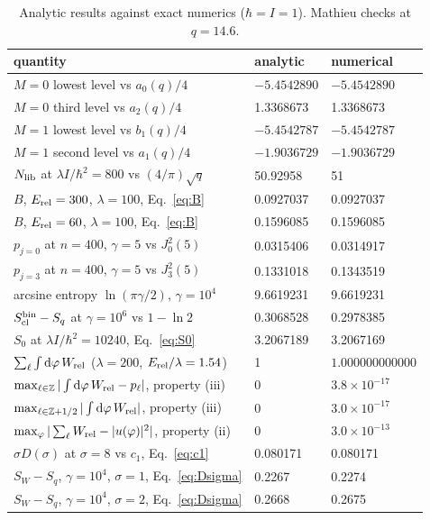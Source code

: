 \documentclass[preprint,12pt]{elsarticle}
\newcommand{\dd}{\mathrm{d}}
\newcommand{\Erel}{E_{\rm rel}}
\newcommand{\Scl}{S_{\rm cl}}
\newcommand{\SW}{S_{W}}
\begin{document}
\begin{table}[h]
\centering
\caption{Analytic results against exact numerics ($\hbar=I=1$). Mathieu checks
at $q=14.6$.}
\label{tab:checks}
\small
\renewcommand{\arraystretch}{1.12}
\begin{tabular}{lll}
\toprule
quantity & analytic & numerical\\
\midrule
$M=0$ lowest level vs $a_{0}(q)/4$ & $-5.4542890$ & $-5.4542890$ \\
$M=0$ third level vs $a_{2}(q)/4$ & 1.3368673 & 1.3368673 \\
$M=1$ lowest level vs $b_{1}(q)/4$ & $-5.4542787$ & $-5.4542787$ \\
$M=1$ second level vs $a_{1}(q)/4$ & $-1.9036729$ & $-1.9036729$ \\
$N_{\rm lib}$ at $\lambda I/\hbar^{2}=800$ vs $(4/\pi)\sqrt q$ & 50.92958 & 51 \\
$B$, $\Erel=300$, $\lambda=100$, Eq.~\eqref{eq:B} & 0.0927037 & 0.0927037 \\
$B$, $\Erel=60$, $\lambda=100$, Eq.~\eqref{eq:B} & 0.1596085 & 0.1596085 \\
$p_{j=0}$ at $n=400$, $\gamma=5$ vs $J_{0}^{2}(5)$ & 0.0315406 & 0.0314917 \\
$p_{j=3}$ at $n=400$, $\gamma=5$ vs $J_{3}^{2}(5)$ & 0.1331018 & 0.1343519 \\
arcsine entropy $\ln(\pi\gamma/2)$, $\gamma=10^{4}$ & 9.6619231 & 9.6619231 \\
$\Scl^{\rm bin}-S_{q}$ at $\gamma=10^{6}$ vs $1-\ln2$ & 0.3068528 & 0.2978385 \\
$S_{0}$ at $\lambda I/\hbar^{2}=10240$, Eq.~\eqref{eq:S0} & 3.2067189 & 3.2067169 \\
\midrule
$\sum_{\ell}\int\dd\varphi\,W_{\rm rel}$ ($\lambda=200$, $\Erel/\lambda=1.54$) & 1 & $1.000000000000$\\
$\max_{\ell\in\mathbb{Z}}|\int\dd\varphi\,W_{\rm rel}-p_{\ell}|$, property (iii) & 0 & $3.8\times10^{-17}$\\
$\max_{\ell\in\mathbb{Z}+1/2}|\int\dd\varphi\,W_{\rm rel}|$, property (iii) & 0 & $3.0\times10^{-17}$\\
$\max_{\varphi}|\sum_{\ell}W_{\rm rel}-|u(\varphi)|^{2}|$, property (ii) & 0 & $3.0\times10^{-13}$\\
$\sigma D(\sigma)$ at $\sigma=8$ vs $c_{1}$, Eq.~\eqref{eq:c1} & 0.080171 & 0.080171 \\
$\SW-S_{q}$, $\gamma=10^{4}$, $\sigma=1$, Eq.~\eqref{eq:Dsigma} & 0.2267 & 0.2274 \\
$\SW-S_{q}$, $\gamma=10^{4}$, $\sigma=2$, Eq.~\eqref{eq:Dsigma} & 0.2668 & 0.2675 \\
\bottomrule
\end{tabular}
\end{table}
\end{document}
